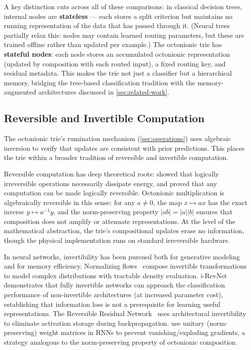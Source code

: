 \documentclass[11pt,a4paper]{article}
\theoremstyle{definition}
\theoremstyle{remark}
\begin{document}
A key distinction cuts across all of these comparisons: in classical decision trees, internal nodes are \textbf{stateless} --- each stores a split criterion but maintains no running representation of the data that has passed through it. (Neural trees partially relax this: nodes may contain learned routing parameters, but these are trained offline rather than updated per example.) The octonionic trie has \textbf{stateful nodes}: each node stores an accumulated octonionic representation (updated by composition with each routed input), a fixed routing key, and residual metadata. This makes the trie not just a classifier but a hierarchical memory, bridging the tree-based classification tradition with the memory-augmented architectures discussed in \cref{sec:related-work}.

\subsection{Reversible and Invertible Computation}

The octonionic trie's rumination mechanism (\cref{sec:operations}) uses algebraic inversion to verify that updates are consistent with prior predictions. This places the trie within a broader tradition of reversible and invertible computation.

Reversible computation has deep theoretical roots: \citet{Landauer1961} showed that logically irreversible operations necessarily dissipate energy, and \citet{Bennett1973} proved that any computation can be made logically reversible. Octonionic multiplication is algebraically reversible in this sense: for any $a \neq 0$, the map $x \mapsto ax$ has the exact inverse $y \mapsto a^{-1}y$, and the norm-preserving property $\lvert ab \rvert = \lvert a \rvert \lvert b \rvert$ ensures that composition does not amplify or attenuate representations. At the level of the mathematical abstraction, the trie's compositional updates erase no information, though the physical implementation runs on standard irreversible hardware.

In neural networks, invertibility has been pursued both for generative modeling and for memory efficiency. Normalizing flows~\citep{Dinh2016,Kingma2018,Papamakarios2021} compose invertible transformations to model complex distributions with tractable density evaluation. i-RevNet~\citep{Jacobsen2018} demonstrates that fully invertible networks can approach the classification performance of non-invertible architectures (at increased parameter cost), establishing that information loss is not a prerequisite for learning useful representations. The Reversible Residual Network~\citep{Gomez2017} uses architectural invertibility to eliminate activation storage during backpropagation. \citet{Arjovsky2016} use unitary (norm-preserving) weight matrices in RNNs to prevent vanishing/exploding gradients, a strategy analogous to the norm-preserving property of octonionic composition.
\end{document}
